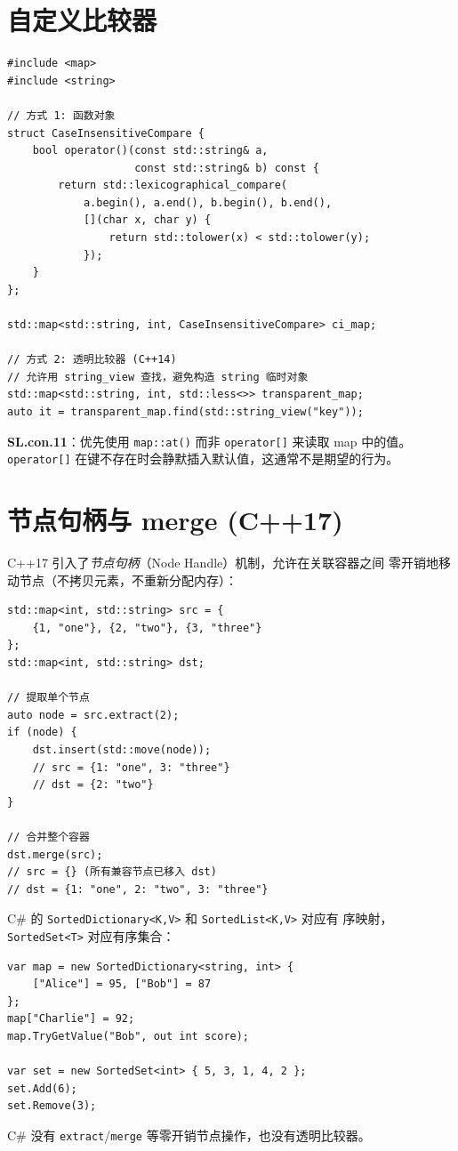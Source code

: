 \documentclass[12pt,a4paper,fontset=fandol]{ctexbook}
\newcommand{\cpp}[1]{C++#1}
\begin{document}
\section{自定义比较器}

\begin{lstlisting}
#include <map>
#include <string>

// 方式 1: 函数对象
struct CaseInsensitiveCompare {
    bool operator()(const std::string& a,
                    const std::string& b) const {
        return std::lexicographical_compare(
            a.begin(), a.end(), b.begin(), b.end(),
            [](char x, char y) {
                return std::tolower(x) < std::tolower(y);
            });
    }
};

std::map<std::string, int, CaseInsensitiveCompare> ci_map;

// 方式 2: 透明比较器 (C++14)
// 允许用 string_view 查找，避免构造 string 临时对象
std::map<std::string, int, std::less<>> transparent_map;
auto it = transparent_map.find(std::string_view("key"));
\end{lstlisting}

\begin{guideline}
\textbf{SL.con.11}：优先使用 \texttt{map::at()} 而非 \texttt{operator[]} 来读取 map 中的值。
\texttt{operator[]} 在键不存在时会静默插入默认值，这通常不是期望的行为。
\end{guideline}

\section{节点句柄与 merge (C++17)}

\cpp{17} 引入了\emph{节点句柄}（Node Handle）机制，允许在关联容器之间
零开销地移动节点（不拷贝元素，不重新分配内存）：

\begin{lstlisting}
std::map<int, std::string> src = {
    {1, "one"}, {2, "two"}, {3, "three"}
};
std::map<int, std::string> dst;

// 提取单个节点
auto node = src.extract(2);
if (node) {
    dst.insert(std::move(node));
    // src = {1: "one", 3: "three"}
    // dst = {2: "two"}
}

// 合并整个容器
dst.merge(src);
// src = {} (所有兼容节点已移入 dst)
// dst = {1: "one", 2: "two", 3: "three"}
\end{lstlisting}

\begin{compare}
C\# 的 \texttt{SortedDictionary<K,V>} 和 \texttt{SortedList<K,V>} 对应有
序映射，\texttt{SortedSet<T>} 对应有序集合：
\begin{lstlisting}[style=csharpstyle]
var map = new SortedDictionary<string, int> {
    ["Alice"] = 95, ["Bob"] = 87
};
map["Charlie"] = 92;
map.TryGetValue("Bob", out int score);

var set = new SortedSet<int> { 5, 3, 1, 4, 2 };
set.Add(6);
set.Remove(3);
\end{lstlisting}
C\# 没有 \texttt{extract}/\allowbreak{}\texttt{merge} 等零开销节点操作，也没有透明比较器。
\end{compare}
\end{document}

